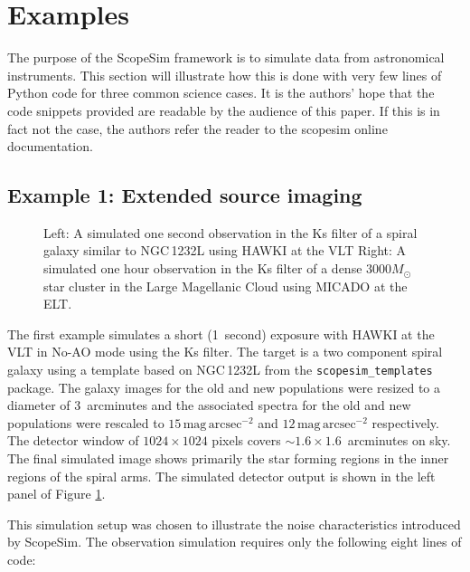 

\section{Examples}
\label{examples}

The purpose of the ScopeSim framework is to simulate data from astronomical instruments.
This section will illustrate how this is done with very few lines of Python code for three common science cases.
It is the authors' hope that the code snippets provided are readable by the audience of this paper.
If this is in fact not the case, the authors refer the reader to the scopesim online documentation.


\subsection{Example 1: Extended source imaging}
\label{example-1-extended-source-imaging}

\begin{figure}

\caption{Left: A simulated one second observation in the Ks filter of a spiral galaxy similar to NGC\,1232L using HAWKI\cite{hawki} at the VLT
Right: A simulated one hour observation in the Ks filter of a dense $3000 M_{\odot}$ star cluster in the Large Magellanic Cloud using MICADO at the ELT.}
\label{fig:combined_1_2}

\end{figure}

The first example simulates a short (1~second) exposure with HAWKI \cite{hawki} at the VLT in No-AO mode using the Ks filter.
The target is a two component spiral galaxy using a template based on NGC\,1232L from the \lstinline{scopesim_templates} package.
The galaxy images for the old and new populations were resized to a diameter of 3~arcminutes and the associated spectra for the old and new populations \citep{brown2014} were rescaled to $15\,\mathrm{mag\,arcsec^{-2}}$ and $12\,\mathrm{mag\,arcsec^{-2}}$ respectively.
The detector window of $1024 \times 1024$ pixels covers $\sim 1.6 \times 1.6$~arcminutes on sky.
The final simulated image shows primarily the star forming regions in the inner regions of the spiral arms.
The simulated detector output is shown in the left panel of Figure \ref{fig:combined_1_2}.

This simulation setup was chosen to illustrate the noise characteristics introduced by ScopeSim.
The observation simulation requires only the following eight lines of code:

